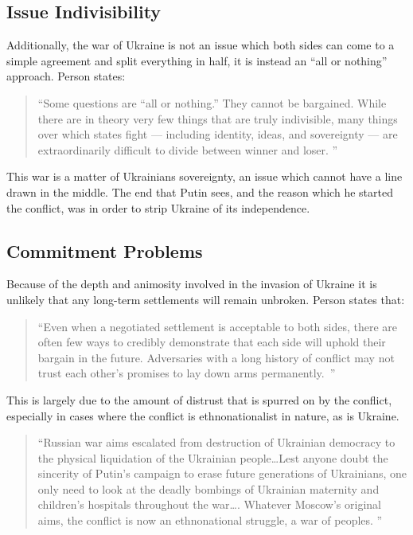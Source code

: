 \documentclass{article}
\begin{document}
    \subsection{Issue Indivisibility}

        Additionally, the war of Ukraine is not an issue which both sides can come to a simple agreement and split everything in half, it is instead an ``all or nothing'' approach. Person states:
        
        \begin{quote}
            ``Some questions are “all or nothing.” They cannot be bargained. While there are in theory very few things that are truly indivisible, many things over which states fight — including identity, ideas, and sovereignty — are extraordinarily difficult to divide between winner and loser. \parencite{person_2025}''
        \end{quote}
        
        This war is a matter of Ukrainians sovereignty, an issue which cannot have a line drawn in the middle. The end that Putin sees, and the reason which he started the conflict, was in order to strip Ukraine of its independence. 

    \subsection{Commitment Problems}

        Because of the depth and animosity involved in the invasion of Ukraine it is unlikely that any long-term settlements will remain unbroken. Person states that:
        \begin{quote}
            ``Even when a negotiated settlement is acceptable to both sides, there are often few ways to credibly demonstrate that each side will uphold their bargain in the future. Adversaries with a long history of conflict may not trust each other’s promises to lay down arms permanently.~\parencite{person_2025}''
        \end{quote}

        This is largely due to the amount of distrust that is spurred on by the conflict, especially in cases where the conflict is ethnonationalist in nature, as is Ukraine.

        \begin{quote}
           ``Russian war aims escalated from destruction of Ukrainian democracy to the physical liquidation of the Ukrainian people\ldots Lest anyone doubt the sincerity of Putin’s campaign to erase future generations of Ukrainians, one only need to look at the deadly bombings of Ukrainian maternity and children’s hospitals throughout the war\ldots. Whatever Moscow’s original aims, the conflict is now an ethnonational struggle, a war of peoples. ''
        \end{quote}
\end{document}

